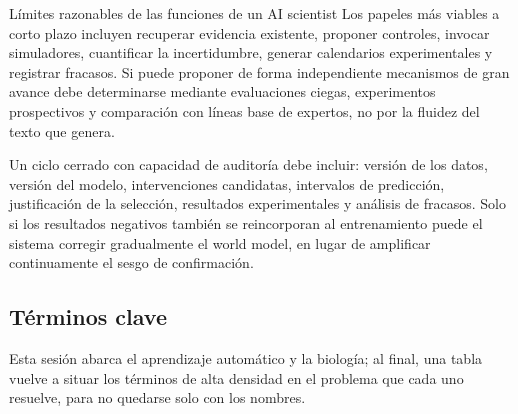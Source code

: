 \documentclass[a4paper]{article}
\begin{document}

\begin{knowledgebox}{Límites razonables de las funciones de un AI scientist}
Los papeles más viables a corto plazo incluyen recuperar evidencia existente, proponer controles, invocar simuladores, cuantificar la incertidumbre, generar calendarios experimentales y registrar fracasos. Si puede proponer de forma independiente mecanismos de gran avance debe determinarse mediante evaluaciones ciegas, experimentos prospectivos y comparación con líneas base de expertos, no por la fluidez del texto que genera.
\end{knowledgebox}

Un ciclo cerrado con capacidad de auditoría debe incluir: versión de los datos, versión del modelo, intervenciones candidatas, intervalos de predicción, justificación de la selección, resultados experimentales y análisis de fracasos. Solo si los resultados negativos también se reincorporan al entrenamiento puede el sistema corregir gradualmente el world model, en lugar de amplificar continuamente el sesgo de confirmación.

\subsection{Términos clave}

Esta sesión abarca el aprendizaje automático y la biología; al final, una tabla vuelve a situar los términos de alta densidad en el problema que cada uno resuelve, para no quedarse solo con los nombres.
\end{document}
